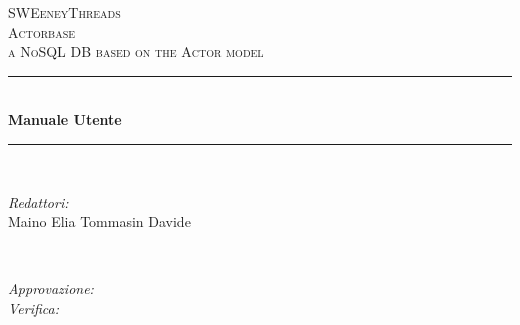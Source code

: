 \documentclass[a4paper]{article}
\begin{document}
	
	\begin{titlepage}
		\newcommand{\HRule}{\rule{\linewidth}{0.5mm}} 
		\center  
		
		\textsc{\LARGE SWEeneyThreads}\\[1.5cm] 
		\textsc{\Large Actorbase}\\[0.5cm] 
		\textsc{\large a NoSQL DB based on the Actor model}\\[0.5cm]
		
		
		\HRule \\[0.4cm]
		{ \huge \bfseries Manuale Utente}\\[0.4cm] 
		\HRule \\[1.5cm]
		
		\begin{minipage}{0.4\textwidth}
			\begin{flushleft} \large
				\emph{Redattori:}\\
				Maino Elia \newline
				Tommasin Davide \\
			\end{flushleft}
		\end{minipage}
		~
		\begin{minipage}{0.4\textwidth}
			\begin{flushright} \large
				\emph{Approvazione:} \\
				\emph{Verifica:} 
			\end{flushright}
		\end{minipage}
		

\end{titlepage}
\end{document}
